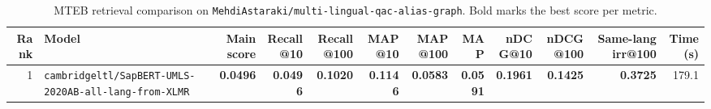 \begin{table}[t]
\centering
\small
\begin{tabular}{r l r r r r r r r r r r}
\hline
Rank & Model & Main score & Recall@10 & Recall@100 & MAP@10 & MAP@100 & MAP & nDCG@10 & nDCG@100 & Same-lang irr@100 & Time (s) \\
\hline
1 & \texttt{cambridgeltl/SapBERT-UMLS-2020AB-all-lang-from-XLMR} & \textbf{0.0496} & \textbf{0.0496} & \textbf{0.1020} & \textbf{0.1146} & \textbf{0.0583} & \textbf{0.0591} & \textbf{0.1961} & \textbf{0.1425} & \textbf{0.3725} & 179.1 \\
\hline
\end{tabular}
\caption{MTEB retrieval comparison on \texttt{MehdiAstaraki/multi-lingual-qac-alias-graph}. Bold marks the best score per metric.}
\label{tab:mteb-model-comparison}
\end{table}
